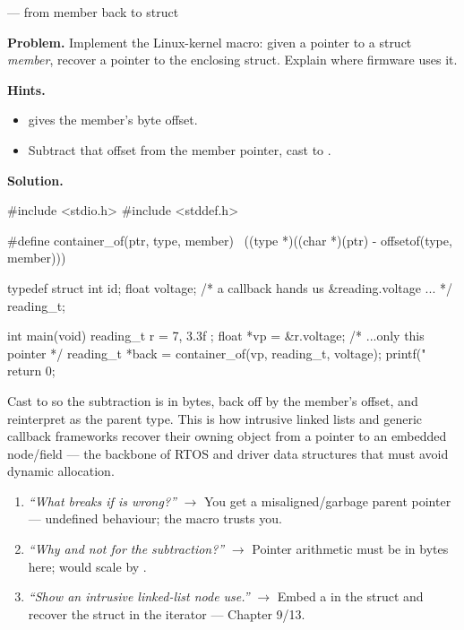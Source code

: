 \begin{gymproblem}{ --- from member back to struct}

\textbf{Problem.} Implement the Linux-kernel  macro:
given a pointer to a struct \emph{member}, recover a pointer to the enclosing
struct. Explain where firmware uses it.

\textbf{Hints.}
\begin{itemize}
\item {} gives the member's byte offset.
\item Subtract that offset from the member pointer, cast to .
\end{itemize}

\attempt

\textbf{Solution.}
\begin{cgym}
#include <stdio.h>
#include <stddef.h>

#define container_of(ptr, type, member) \
    ((type *)((char *)(ptr) - offsetof(type, member)))

typedef struct {
    int   id;
    float voltage;      /* a callback hands us &reading.voltage ... */
} reading_t;

int main(void) {
    reading_t r = { 7, 3.3f };
    float *vp = &r.voltage;                       /* ...only this pointer  */
    reading_t *back = container_of(vp, reading_t, voltage);
    printf("%
    return 0;
}
\end{cgym}

Cast to  so the subtraction is in bytes, back off by the member's
offset, and reinterpret as the parent type. This is how intrusive linked
lists and generic callback frameworks recover their owning object from a
pointer to an embedded node/field --- the backbone of RTOS and driver data
structures that must avoid dynamic allocation.

\followups
\begin{enumerate}
\item \emph{``What breaks if  is wrong?''} $\rightarrow$ You get
  a misaligned/garbage parent pointer --- undefined behaviour; the macro
  trusts you.
\item \emph{``Why  and not  for the subtraction?''}
  $\rightarrow$ Pointer arithmetic must be in bytes here; \code{type*} would
  scale by \code{sizeof(type)}.
\item \emph{``Show an intrusive linked-list node use.''} $\rightarrow$ Embed a
  \code{list\_node} in the struct and recover the struct in the iterator ---
  Chapter 9/13.
\end{enumerate}
\end{gymproblem}

